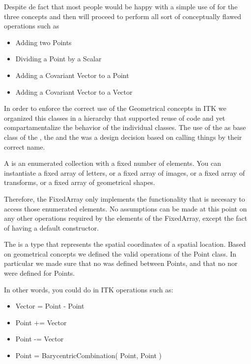 Despite de fact that most people would be happy with a simple use of
 for the three concepts and then will proceed to perform all
sort of conceptually flawed operations such as 

\begin{itemize}
\item Adding two Points
\item Dividing a Point by a Scalar
\item Adding a Covariant Vector to a Point
\item Adding a Covariant Vector to a Vector
\end{itemize}

In order to enforce the correct use of the Geometrical concepts in ITK we
organized this classes in a hierarchy that supported reuse of code and yet
compartamentalize the behavior of the individual classes.  The use of the
 as base class of the , the 
and the  was a design decision based on calling things
by their correct name.

A  is an enumerated collection with a fixed number of
elements. You can instantiate a fixed array of letters, or a fixed array of
images, or a fixed array of transforms, or a fixed array of geometrical shapes.

Therefore, the FixedArray only implements the functionality that is necesary to
access those enumerated elements. No assumptions can be made at this point on
any other operations required by the elements of the FixedArray, except the
fact of having a default constructor.

The  is a type that represents the spatial coordinates of a
spatial location. Based on geometrical concepts we defined the valid operations
of the Point class. In particular we made sure that no  was
defined between Points, and that no  nor
 were defined for Points.

In other words, you could do in ITK operations such as:

\begin{itemize}
\item Vector  = Point - Point
\item Point  +=  Vector
\item Point  -=  Vector
\item Point  = BarycentricCombination( Point, Point )
\end{itemize}

